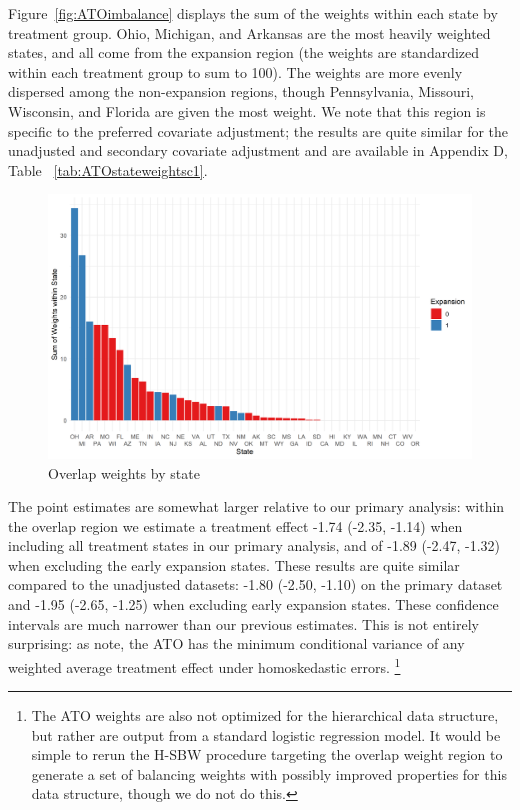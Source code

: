 Figure~\ref{fig:ATOimbalance} displays the sum of the weights within each state by treatment group. Ohio, Michigan, and Arkansas are the most heavily weighted states, and all come from the expansion region (the weights are standardized within each treatment group to sum to 100). The weights are more evenly dispersed among the non-expansion regions, though Pennsylvania, Missouri, Wisconsin, and Florida are given the most weight. We note that this region is specific to the preferred covariate adjustment; the results are quite similar for the unadjusted and secondary covariate adjustment and are available in Appendix D, Table ~\ref{tab:ATOstateweightsc1}.

\begin{figure}[H]
\begin{center}
    \caption{Overlap weights by state}
    \label{ATOarea}
    \includegraphics[scale=0.6]{01_plots/oate-region-c1-a.png}
\end{center}
\end{figure}

The point estimates are somewhat larger relative to our primary analysis: within the overlap region we estimate a treatment effect -1.74 (-2.35, -1.14) when including all treatment states in our primary analysis, and of -1.89 (-2.47, -1.32) when excluding the early expansion states. These results are quite similar compared to the unadjusted datasets: -1.80 (-2.50, -1.10) on the primary dataset and -1.95 (-2.65, -1.25) when excluding early expansion states. These confidence intervals are much narrower than our previous estimates. This is not entirely surprising: as \cite{li2018balancing} note, the ATO has the minimum conditional variance of any weighted average treatment effect under homoskedastic errors. \footnote{The ATO weights are also not optimized for the hierarchical data structure, but rather are output from a standard logistic regression model. It would be simple to rerun the H-SBW procedure targeting the overlap weight region to generate a set of balancing weights with possibly improved properties for this data structure, though we do not do this.}

